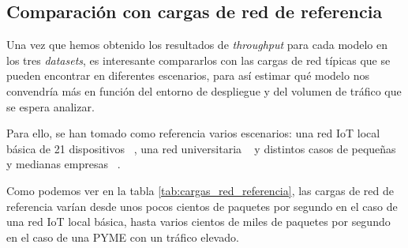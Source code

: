 \subsection{Comparación con cargas de red de referencia}

Una vez que hemos obtenido los resultados de \textit{throughput} para cada modelo en los tres \textit{datasets}, es interesante compararlos con las cargas de red típicas que se pueden encontrar en diferentes escenarios, para así estimar qué modelo nos convendría más en función del entorno de despliegue y del volumen de tráfico que se espera analizar.

Para ello, se han tomado como referencia varios escenarios: una red IoT local básica de 21 dispositivos ~\cite{cargas_iot}, una red universitaria ~\cite{cargas_universitarias} y distintos casos de pequeñas y medianas empresas ~\cite{cargas_pymes}.

\begin{table}[H]
\centering
\caption{Cargas de red de referencia expresadas en paquetes por segundo}
\label{tab:cargas_red_referencia}
\end{table}

Como podemos ver en la tabla \ref{tab:cargas_red_referencia}, las cargas de red de referencia varían desde unos pocos cientos de paquetes por segundo en el caso de una red IoT local básica, hasta varios cientos de miles de paquetes por segundo en el caso de una PYME con un tráfico elevado.

